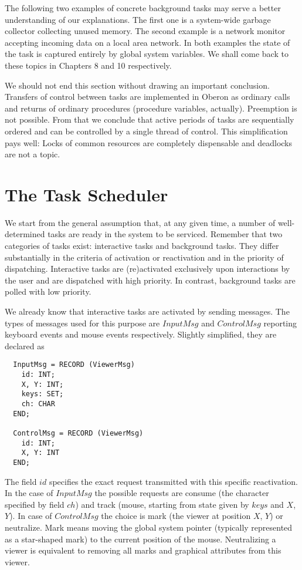 The following two examples of concrete background tasks may serve a better understanding of our explanations. The first one is a system-wide garbage collector collecting unused memory. The second example is a network monitor accepting incoming data on a local area network. In both
examples the state of the task is captured entirely by global system variables. We shall come back to these topics in Chapters 8 and 10 respectively.

We should not end this section without drawing an important conclusion. Transfers of control between tasks are implemented in Oberon as ordinary calls and returns of ordinary procedures (procedure variables, actually). Preemption is not possible. From that we conclude that active periods of tasks are sequentially ordered and can be controlled by a single thread of control. This simplification pays well: Locks of common resources are completely dispensable and deadlocks are not a topic.

\section{The Task Scheduler}
We start from the general assumption that, at any given time, a number of well-determined tasks
are ready in the system to be serviced. Remember that two categories of tasks exist: interactive tasks and background tasks. They differ substantially in the criteria of activation or reactivation
and in the priority of dispatching. Interactive tasks are (re)activated exclusively upon interactions by the user and are dispatched with high priority. In contrast, background tasks are polled with low priority.

We already know that interactive tasks are activated by sending messages. The types of messages used for this purpose are $InputMsg$ and $ControlMsg$ reporting keyboard events and mouse events respectively. Slightly simplified, they are declared as
\begin{verbatim}
  InputMsg = RECORD (ViewerMsg)
    id: INT;
    X, Y: INT;
    keys: SET;
    ch: CHAR
  END;

  ControlMsg = RECORD (ViewerMsg)
    id: INT;
    X, Y: INT
  END;
\end{verbatim}
The field $id$ specifies the exact request transmitted with this specific reactivation. In the case of $InputMsg$ the possible requests are consume (the character specified by field $ch$) and track (mouse, starting from state given by $keys$ and $X$, $Y$). In case of $ControlMsg$ the choice is mark (the viewer at position $X$, $Y$) or neutralize. Mark means moving the global system pointer (typically represented as a star-shaped mark) to the current position of the mouse. Neutralizing a viewer is
equivalent to removing all marks and graphical attributes from this viewer.

